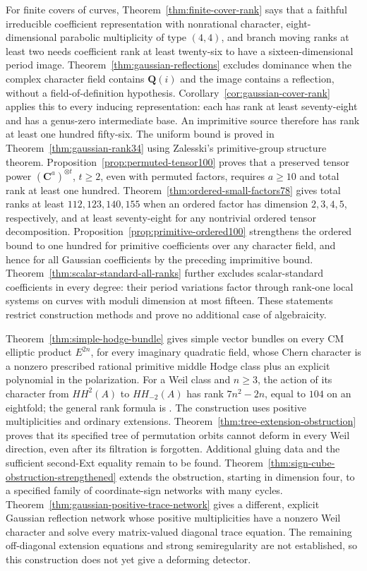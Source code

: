 \documentclass[11pt]{article}
\theoremstyle{definition}
\theoremstyle{remark}
\newcommand{\Q}{\mathbf Q}
\newcommand{\C}{\mathbf C}
\begin{document}
For finite covers of curves, Theorem~\ref{thm:finite-cover-rank} says that a faithful irreducible coefficient representation with nonrational character, eight-dimensional parabolic multiplicity of type $(4,4)$, and branch moving ranks at least two needs coefficient rank at least twenty-six to have a sixteen-dimensional period image. Theorem~\ref{thm:gaussian-reflections} excludes dominance when
the complex character field contains $\Q(i)$ and the image contains
a reflection, without a field-of-definition hypothesis.
Corollary~\ref{cor:gaussian-cover-rank} applies this to every
inducing representation: each has rank at least seventy-eight and has
a genus-zero intermediate base. An imprimitive source therefore
has rank at least one hundred fifty-six. The uniform bound is proved in
Theorem~\ref{thm:gaussian-rank34} using Zalesski's primitive-group
structure theorem. Proposition~\ref{prop:permuted-tensor100}
proves that a preserved tensor power $(\C^a)^{\otimes t}$, $t\geq2$,
even with permuted factors, requires $a\geq10$ and total rank at
least one hundred. Theorem~\ref{thm:ordered-small-factors78} gives total ranks
at least $112,123,140,155$ when an ordered factor has dimension
$2,3,4,5$, respectively, and at least seventy-eight for any
nontrivial ordered tensor decomposition. Proposition~\ref{prop:primitive-ordered100}
strengthens the ordered bound to one hundred for primitive
coefficients over any character field, and hence for all Gaussian
coefficients by the preceding imprimitive bound. Theorem~\ref{thm:scalar-standard-all-ranks} further excludes scalar-standard coefficients in every degree: their period variations factor through rank-one local systems on curves with moduli dimension at most fifteen. These statements restrict construction methods and prove no additional case of algebraicity.


Theorem~\ref{thm:simple-hodge-bundle} gives simple vector bundles on
every CM elliptic product $E^{2n}$, for every imaginary quadratic
field, whose Chern character is a nonzero prescribed rational primitive
middle Hodge class plus an explicit polynomial in the polarization.
For a Weil class and $n\ge3$, the action of its character from
$HH^2(A)$ to $HH_{-2}(A)$ has rank
$7n^2-2n$, equal to $104$ on an eightfold; the general rank formula
is \cite[Theorem~A6]{BBK3Sixfolds}.
The construction uses positive multiplicities and ordinary extensions.
Theorem~\ref{thm:tree-extension-obstruction} proves that its specified
tree of permutation orbits cannot deform in every Weil direction,
even after its filtration is forgotten.  Additional gluing data and
the sufficient second-Ext equality remain to be found.
Theorem~\ref{thm:sign-cube-obstruction-strengthened} extends the obstruction, starting in dimension four, to a
specified family of coordinate-sign networks with many cycles.
Theorem~\ref{thm:gaussian-positive-trace-network} gives a different,
explicit Gaussian reflection network whose positive multiplicities
have a nonzero Weil character and solve every matrix-valued diagonal
trace equation.  The remaining off-diagonal extension equations and
strong semiregularity are not established, so this construction does
not yet give a deforming detector.
\end{document}
